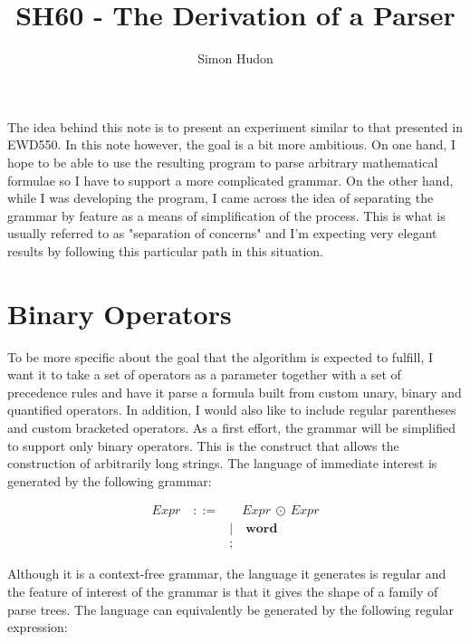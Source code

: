 \documentclass[10pt]{report}
\title{SH60 - The Derivation of a Parser}
\author{Simon Hudon}
\newcommand{\word}{\textbf{word}}
\begin{document}
\maketitle

The idea behind this note is to present an experiment similar to that presented in EWD550.  In this note however, the goal is a bit more ambitious.  On one hand, I hope to be able to use the resulting program to parse arbitrary mathematical formulae so I have to support a more complicated grammar.  On the other hand, while I was developing the program, I came across the idea of separating the grammar by feature as a means of simplification of the process.  This is what is usually referred to as "separation of concerns" and I'm expecting very elegant results by following this particular path in this situation.

\chapter{Binary Operators}

To be more specific about the goal that the algorithm is expected to fulfill, I want it to take a set of operators as a parameter together with a set of precedence rules and have it parse a formula built from custom unary, binary and quantified operators.  In addition, I would also like to include regular parentheses and custom bracketed operators.  As a first effort, the grammar will be simplified to support only binary operators.  This is the construct that allows the construction of arbitrarily long strings.  The language of immediate interest is generated by the following grammar:

\begin{align}
	Expr \quad ::= & \quad Expr  \ \odot \ Expr  \label{csyntax} \\
		& | \quad \word \nonumber \\
		& \nonumber ;
\end{align}

Although it is a context-free grammar, the language it generates is regular and the feature of interest of the grammar is that it gives the shape of a family of parse trees.  The language can equivalently be generated by the following regular expression:
\end{document}
